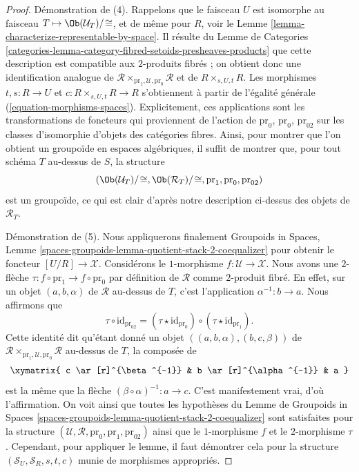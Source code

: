 \begin{proof}
\medskip\noindent
Démonstration de (4). Rappelons que le faisceau $U$ est isomorphe au faisceau
$T \mapsto \Ob(\mathcal{U}_T)/\!\cong$, et
de même pour $R$, voir le
Lemme \ref{lemma-characterize-representable-by-space}.
Il résulte du
Lemme de Categories
\ref{categories-lemma-category-fibred-setoids-presheaves-products}
que cette description est compatible aux $2$-produits fibrés ;
on obtient donc une identification analogue de
$\mathcal{R} \times_{\text{pr}_1, \mathcal{U}, \text{pr}_0} \mathcal{R}$
et de $R \times_{s, U, t} R$.
Les morphismes $t, s : R \to U$ et $c : R \times_{s, U, t} R \to R$
s'obtiennent à partir de l'égalité générale (\ref{equation-morphisms-spaces}).
Explicitement, ces applications sont les transformations de foncteurs qui proviennent
de l'action de $\text{pr}_0$, $\text{pr}_0$, $\text{pr}_{02}$
sur les classes d'isomorphie d'objets des catégories fibres.
Ainsi, pour montrer que l'on obtient un groupoïde en espaces
algébriques, il suffit de montrer que, pour tout schéma $T$ au-dessus de $S$,
la structure
$$
(\Ob(\mathcal{U}_T)/\!\cong,
\Ob(\mathcal{R}_T)/\!\cong,
\text{pr}_1, \text{pr}_0, \text{pr}_{02})
$$
est un groupoïde, ce qui est clair d'après notre description ci-dessus des objets de
$\mathcal{R}_T$.

\medskip\noindent
Démonstration de (5). Nous appliquerons finalement
Groupoids in Spaces,
Lemme \ref{spaces-groupoids-lemma-quotient-stack-2-coequalizer}
pour obtenir le foncteur $[U/R] \to \mathcal{X}$.
Considérons le $1$-morphisme $f : \mathcal{U} \to \mathcal{X}$.
Nous avons une $2$-flèche $\tau : f \circ \text{pr}_1 \to f \circ \text{pr}_0$
par définition de $\mathcal{R}$ comme $2$-produit fibré.
En effet, sur un objet $(a, b, \alpha)$ de $\mathcal{R}$ au-dessus de $T$, c'est
l'application $\alpha^{-1} : b \to a$. Nous affirmons que
$$
\tau \circ \text{id}_{\text{pr}_{02}} =
(\tau \star \text{id}_{\text{pr}_0})
\circ
(\tau \star \text{id}_{\text{pr}_1}).
$$
Cette identité dit qu'étant donné un objet
$((a, b, \alpha), (b, c, \beta))$ de
$\mathcal{R} \times_{\text{pr}_1, \mathcal{U}, \text{pr}_0} \mathcal{R}$
au-dessus de $T$, la composée de
$$
\xymatrix{
c \ar[r]^{\beta^{-1}} & b \ar[r]^{\alpha^{-1}} & a
}
$$
est la même que la flèche $(\beta \circ \alpha)^{-1} : a \to c$. C'est
manifestement vrai, d'où l'affirmation. On voit ainsi que toutes les
hypothèses du
Lemme de Groupoids in Spaces
\ref{spaces-groupoids-lemma-quotient-stack-2-coequalizer}
sont satisfaites pour la structure
$(\mathcal{U}, \mathcal{R}, \text{pr}_0, \text{pr}_1, \text{pr}_{02})$
ainsi que le $1$-morphisme $f$ et le $2$-morphisme $\tau$.
Cependant, pour appliquer le lemme, il faut démontrer cela
pour la structure $(\mathcal{S}_U, \mathcal{S}_R, s, t, c)$
munie de morphismes appropriés.


\end{proof}
